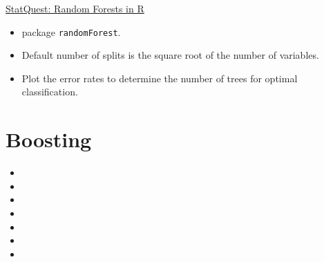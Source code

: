 \documentclass[12pt, titlepage, french]{report}
\begin{document}
\begin{YTB_SUMM_AUTO_NUMB}[label = {SQ-RF-R}]{\href{https://www.youtube.com/watch?v=6EXPYzbfLCE&feature=youtu.be}{StatQuest: Random Forests in R}}
\begin{itemize}[leftmargin = *]
	\item	package \texttt{randomForest}.
	\item	Default number of splits is the square root of the number of variables.
	\item	Plot the error rates to determine the number of trees for optimal classification.
\end{itemize}
\end{YTB_SUMM_AUTO_NUMB}

\section*{Boosting}

\begin{YTB_vids}
\begin{itemize}
	\item	{}
	\item	{}
	\item	{}
	\item	{}
	\item	{}
	\item	{}
	\item	{}
\end{itemize}
\end{YTB_vids}
\end{document}
